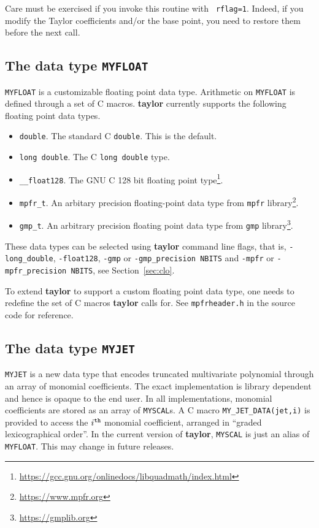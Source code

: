 \documentclass[10pt]{article}
\theoremstyle{remark}
\newcommand{\taylorname}{{\bf taylor}}
\newcommand{\myfloat}{{\tt MY\symbol{95}FLOAT}}
\newcommand{\myjet}{{\tt MY\symbol{95}JET}}
\newcommand{\myscal}{{\tt MY\symbol{95}SCAL}}
\begin{document}
Care must be exercised if you invoke this routine with {\tt
  rflag=1}. Indeed, if you modify the Taylor coefficients and/or the
base point, you need to restore them before the next call.


\subsection{The data type \myfloat{}} \label{sec:myfloat}

\myfloat{} is a customizable floating point data type.  Arithmetic on
\myfloat{} is defined through a set of C macros. \taylorname{}
currently supports the following floating point data types.
\begin{itemize}
    \item \verb+double+.  The standard C \verb+double+.  This is the
      default.
    \item \verb+long double+. The C \verb+long double+ type.
    \item \verb+__float128+. The GNU C 128 bit floating point
      type\footnote{\url{https://gcc.gnu.org/onlinedocs/libquadmath/index.html}}.
    \item \verb+mpfr_t+. An arbitary precision floating-point data
      type from {\tt mpfr}
      library\footnote{\url{https://www.mpfr.org}}.
    \item \verb+gmp_t+. An arbitrary precision floating point data
      type from {\tt gmp}
      library\footnote{\url{https://gmplib.org}}.
\end{itemize}
These data types can be selected using \taylorname{} command line
flags, that is, \verb+-long_double+, \verb+-float128+, \verb+-gmp+ or
\verb+-gmp_precision NBITS+ and \verb+-mpfr+ or
\verb+-mpfr_precision NBITS+, see Section~\ref{sec:clo}.

\bigskip
To extend \taylorname{} to support a custom floating point data type,
one needs to redefine the set of C macros \taylorname{} calls for. See
{\tt{mpfrheader.h}} in the source code for reference.


\subsection{The data type \myjet{}} \label{sec:myjet}
\myjet{} is a new data type that encodes truncated multivariate
polynomial through an array of monomial coefficients. The exact
implementation is library dependent and hence is opaque to the end
user. In all implementations, monomial coefficients are stored as an
array of \myscal{}s. A C macro \verb+MY_JET_DATA(jet,i)+ is provided
to access the $i^{{\tt th}}$ monomial coefficient, arranged in
``graded lexicographical order''.  In the current version of
\taylorname{}, \myscal{} is just an alias of \myfloat{}. This may
change in future releases.
\end{document}
